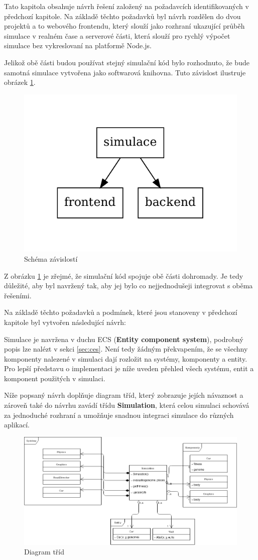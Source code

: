 Tato kapitola obsahuje návrh řešení založený na požadavcích identifikovaných v předchozí kapitole. Na základě těchto požadavků byl návrh rozdělen do dvou projektů a to webového frontendu, který slouží jako rozhraní ukazující průběh simulace v realném čase a serverové části, která slouží pro rychlý výpočet simulace bez vykreslovaní na platformě Node.js.

Jelikož obě části budou používat stejný simulační kód bylo rozhodnuto, že bude samotná simulace vytvořena jako softwarová knihovna. Tuto závislost ilustruje obrázek \ref{fig:dependency}.
\begin{figure}[h!]
	\centering
	\includegraphics[width=0.4\linewidth]{architektura}
	\caption{Schéma závislostí}
	\label{fig:dependency}
\end{figure}


Z obrázku \ref{fig:dependency} je zřejmé, že simulační kód spojuje obě části dohromady. Je tedy důležité, aby byl navržený tak, aby jej bylo co nejjednodušeji integrovat s oběma řešeními.

Na základě těchto požadavků a podmínek, které jsou stanoveny v předchozí kapitole byl vytvořen následující návrh:

\label{sec:ECS}
Simulace je navržena v duchu ECS (\textbf{Entity component system}), podrobný popis lze nalézt v sekci \ref{sec:ces}. Není tedy žádným překvapením, že se všechny komponenty nalezené v simulaci dají rozložit na systémy, komponenty a entity. Pro lepší představu o implementaci je níže uveden přehled všech systému, entit a komponent použitých v simulaci.

Níže popsaný návrh doplňuje diagram tříd, který zobrazuje jejích návaznost a zároveň také do návrhu zavádí třídu \textbf{Simulation}, která celou simulaci schovává za jednoduché rozhraní a umožňuje snadnou integraci simulace do různých aplikací.

\begin{figure}[H]
	\centering
 	\includegraphics[width=0.7\linewidth]{classDiagram}
	\caption{Diagram tříd}
	\label{fig:class-diagram}
\end{figure}

